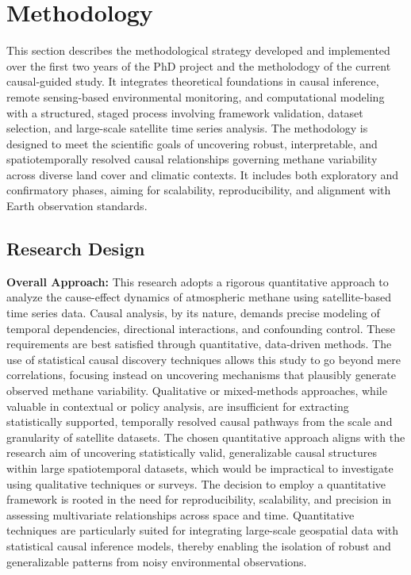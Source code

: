 \cleardoublepage
\label{chap:methodology}

\section{Methodology}

This section describes the methodological strategy developed and implemented over the first two years of the PhD project and the metholodogy of the current causal-guided study. It integrates theoretical foundations in causal inference, remote sensing-based environmental monitoring, and computational modeling with a structured, staged process involving framework validation, dataset selection, and large-scale satellite time series analysis. The methodology is designed to meet the scientific goals of uncovering robust, interpretable, and spatiotemporally resolved causal relationships governing methane variability across diverse land cover and climatic contexts. It includes both exploratory and confirmatory phases, aiming for scalability, reproducibility, and alignment with Earth observation standards.

\subsection{Research Design}

\textbf{Overall Approach:}
This research adopts a rigorous quantitative approach to analyze the cause-effect dynamics of atmospheric methane using satellite-based time series data. Causal analysis, by its nature, demands precise modeling of temporal dependencies, directional interactions, and confounding control. These requirements are best satisfied through quantitative, data-driven methods. The use of statistical causal discovery techniques allows this study to go beyond mere correlations, focusing instead on uncovering mechanisms that plausibly generate observed methane variability. Qualitative or mixed-methods approaches, while valuable in contextual or policy analysis, are insufficient for extracting statistically supported, temporally resolved causal pathways from the scale and granularity of satellite datasets. The chosen quantitative approach aligns with the research aim of uncovering statistically valid, generalizable causal structures within large spatiotemporal datasets, which would be impractical to investigate using qualitative techniques or surveys. The decision to employ a quantitative framework is rooted in the need for reproducibility, scalability, and precision in assessing multivariate relationships across space and time. Quantitative techniques are particularly suited for integrating large-scale geospatial data with statistical causal inference models, thereby enabling the isolation of robust and generalizable patterns from noisy environmental observations.

